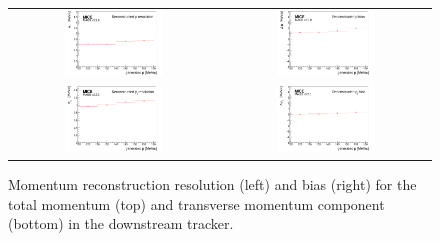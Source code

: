 \begin{figure}[htb]
  \begin{center}
    \begin{tabular}{cc}
      \includegraphics[width=0.49\textwidth]{downstream_p_resolution_p_logo.png} &	
      \includegraphics[width=0.49\textwidth]{downstream_p_bias_p_logo.png} \\
      \includegraphics[width=0.49\textwidth]{downstream_pt_resolution_p_logo.png} &
      \includegraphics[width=0.49\textwidth]{downstream_pt_bias_p_logo.png}
    \end{tabular}
  \end{center}
  \caption{
    Momentum reconstruction resolution (left) and
    bias (right) for the total momentum (top) and transverse
    momentum component (bottom) in the downstream tracker.
  }
  \label{trackers:performance:resolutions:down}
\end{figure}

